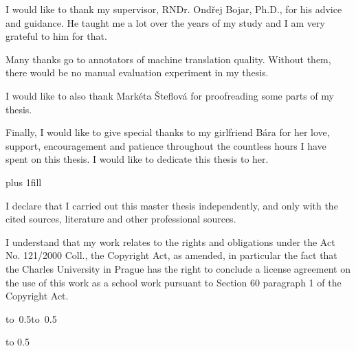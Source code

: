 \documentclass[12pt,a4paper]{report}
\let\openright=\clearpage
\begin{document}
\newpage



\openright

I would like to thank my supervisor, RNDr. Ondřej Bojar, Ph.D., for his advice
and guidance. He taught me a lot over the years of my study and I am very
grateful to him for that. 

Many thanks go to annotators of machine translation quality. Without them,
there would be no manual evaluation experiment in my thesis.

I would like to also thank Markéta Šteflová for proofreading some parts of my
thesis.

Finally, I would like to give special thanks to my girlfriend Bára for her
love, support, encouragement and patience throughout the countless hours I have
spent on this thesis. I would like to dedicate this thesis to her. 

\newpage


\vglue 0pt plus 1fill

\noindent
I declare that I carried out this master thesis independently, and only with the cited
sources, literature and other professional sources.

\medskip\noindent
I understand that my work relates to the rights and obligations under the Act No.
121/2000 Coll., the Copyright Act, as amended, in particular the fact that the Charles
University in Prague has the right to conclude a license agreement on the use of this
work as a school work pursuant to Section 60 paragraph 1 of the Copyright Act.

\vspace{10mm}

\hbox{\hbox to 0.5\hbox to 0.5\hsize{%
\hss}}

\vspace{20mm}
\newpage


\vbox to 0.5\vsize{
\setlength\parindent{0mm}
\setlength\parskip{5mm}



\vss} %
\end{document}
